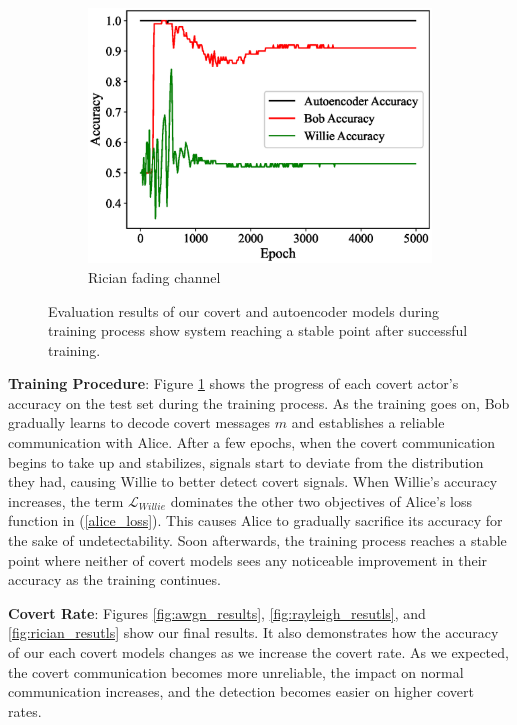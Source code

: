 \begin{figure}[tp!]
\begin{subfigure}{0.24\textwidth}
	\includegraphics[width=\linewidth]{figs/training_progress_rician}
	\caption{Rician fading channel}	
	\end{subfigure}
	\caption{Evaluation results of our covert and autoencoder models during training process show system reaching a stable point after successful training.}
	\label{fig:traning_progress}
\end{figure}


\textbf{Training Procedure}: Figure \ref{fig:traning_progress} shows the progress of each covert actor's accuracy on the test set during the training process. As the training goes on, Bob gradually learns to decode covert messages \(m\) and establishes a reliable communication with Alice. After a few epochs, when the covert communication begins to take up and stabilizes, signals start to deviate from the distribution they had, causing Willie to better detect covert signals. When Willie's accuracy increases, the term \(\mathcal{L}_{Willie}\) dominates the other two objectives of Alice's loss function in (\ref{alice_loss}). This causes Alice to gradually sacrifice its accuracy for the sake of undetectability. Soon afterwards, the training process reaches a stable point where neither of covert models sees any noticeable improvement in their accuracy as the training continues. 


\textbf{Covert Rate}: Figures \ref{fig:awgn_results}, \ref{fig:rayleigh_resutls}, and \ref{fig:rician_resutls} show our final results. It also demonstrates how the accuracy of our each covert models changes as we increase the covert rate. As we expected, the covert communication becomes more unreliable, the impact on normal communication increases, and the detection becomes easier on higher covert rates.


